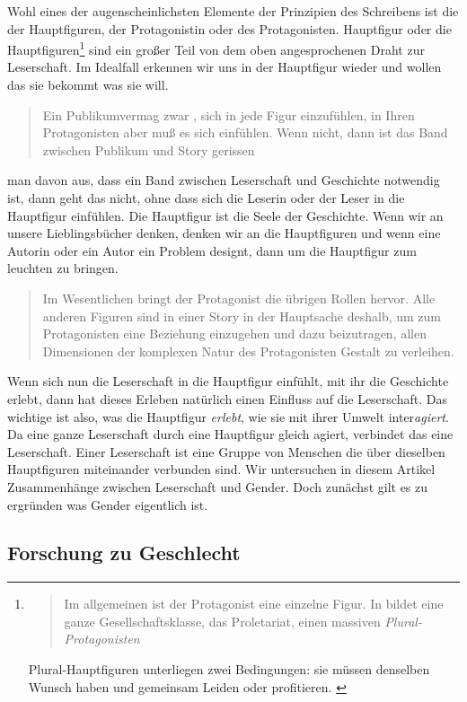   Wohl eines der augenscheinlichsten Elemente der Prinzipien des Schreibens ist
  die der Hauptfiguren, der Protagonistin oder des Protagonisten.  %
  Hauptfigur oder die Hauptfiguren\footnote{\blockcquote[155]{McKee2001}{Im
  allgemeinen ist der Protagonist eine einzelne Figur. \textelp{} In
   bildet eine ganze Gesellschaftsklasse, das
  Proletariat, einen massiven \emph{Plural-Protagonisten}} Plural-Hauptfiguren
  unterliegen zwei Bedingungen: sie müssen denselben Wunsch haben und gemeinsam
  Leiden oder profitieren. \parencite[155]{McKee2001}} sind ein großer Teil von
  dem oben angesprochenen Draht zur Leserschaft. Im Idealfall erkennen wir uns
  in der Hauptfigur wieder und wollen das sie bekommt was sie will.
  \parencite[161]{McKee2001} \blockcquote[161]{McKee2001}{Ein
  Publikum\textelp{}vermag zwar , sich in jede Figur einzufühlen, in Ihren
  Protagonisten aber muß es sich einfühlen. Wenn nicht, dann ist
  das Band zwischen Publikum und Story gerissen} %
  man davon aus, dass ein Band zwischen Leserschaft und Geschichte notwendig
  ist, dann geht das nicht, ohne dass sich die Leserin oder der Leser in die
  Hauptfigur einfühlen. Die Hauptfigur ist die Seele der Geschichte. Wenn wir an
  unsere Lieblingsbücher denken, denken wir an die Hauptfiguren und wenn eine
  Autorin oder ein Autor ein Problem designt, dann um die Hauptfigur zum
  leuchten zu bringen. \blockcquote[407]{McKee2001}{Im Wesentlichen bringt der
  Protagonist die übrigen Rollen hervor. Alle anderen Figuren sind in einer
  Story in der Hauptsache deshalb, um zum Protagonisten eine Beziehung
  einzugehen und dazu beizutragen, allen Dimensionen der komplexen Natur des
  Protagonisten Gestalt zu verleihen.}   Wenn sich nun die Leserschaft in die
  Hauptfigur einfühlt, mit ihr die Geschichte erlebt, dann hat dieses Erleben
  natürlich einen Einfluss auf die Leserschaft. Das wichtige ist also, was die
  Hauptfigur \emph{erlebt}, wie sie mit ihrer Umwelt inter\emph{agiert}. Da eine
  ganze Leserschaft durch eine Hauptfigur gleich agiert, verbindet das eine
  Leserschaft. Einer Leserschaft ist eine Gruppe von Menschen die über dieselben
  Hauptfiguren miteinander verbunden sind. Wir untersuchen in diesem Artikel
  Zusammenhänge zwischen Leserschaft und Gender. Doch zunächst gilt es zu
  ergründen was Gender eigentlich ist.

  \subsection{Forschung zu Geschlecht}


